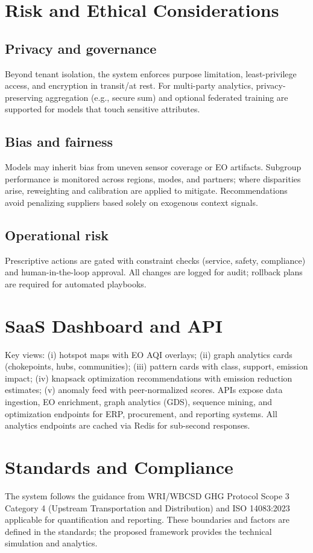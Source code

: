 \documentclass[conference]{IEEEtran}
\begin{document}
\section{Risk and Ethical Considerations}
\subsection{Privacy and governance}
Beyond tenant isolation, the system enforces purpose limitation, least-privilege access, and encryption in transit/at rest. For multi-party analytics, privacy-preserving aggregation (e.g., secure sum) and optional federated training are supported for models that touch sensitive attributes.

\subsection{Bias and fairness}
Models may inherit bias from uneven sensor coverage or EO artifacts. Subgroup performance is monitored across regions, modes, and partners; where disparities arise, reweighting and calibration are applied to mitigate. Recommendations avoid penalizing suppliers based solely on exogenous context signals.

\subsection{Operational risk}
Prescriptive actions are gated with constraint checks (service, safety, compliance) and human-in-the-loop approval. All changes are logged for audit; rollback plans are required for automated playbooks.

\section{SaaS Dashboard and API}
Key views: (i) hotspot maps with EO AQI overlays; (ii) graph analytics cards (chokepoints, hubs, communities); (iii) pattern cards with class, support, emission impact; (iv) knapsack optimization recommendations with emission reduction estimates; (v) anomaly feed with peer-normalized scores. APIs expose data ingestion, EO enrichment, graph analytics (GDS), sequence mining, and optimization endpoints for ERP, procurement, and reporting systems. All analytics endpoints are cached via Redis for sub-second responses.

\section{Standards and Compliance}
The system follows the guidance from WRI/WBCSD GHG Protocol Scope 3 Category 4 (Upstream Transportation and Distribution) and ISO 14083:2023 applicable for quantification and reporting. These boundaries and factors are defined in the standards; the proposed framework provides the technical simulation and analytics.
\end{document}

